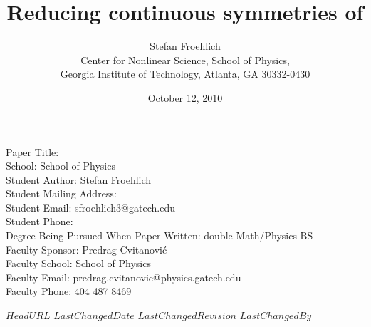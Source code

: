Paper Title:
\\School: School of Physics
\\Student Author: Stefan Froehlich
\\Student Mailing Address:
\\Student Email: sfroehlich3@gatech.edu
\\Student Phone:
\\Degree Being Pursued When Paper Written: double Math/Physics BS
\\Faculty Sponsor: Predrag Cvitanovi\'{c}
\\Faculty School: School of Physics
\\Faculty Email: predrag.cvitanovic@physics.gatech.edu
\\Faculty Phone: 404 487 8469
\newpage

    \ifarticle
    \else
    \fi %

        \title{Reducing continuous symmetries of \cLe}
        \author{
Stefan Froehlich
\\
Center for Nonlinear Science, School of Physics,
\\
Georgia Institute of Technology,
Atlanta, GA 30332-0430
        }
        \date{October 12, 2010} \Private{\date{\today}}

\hypersetup{
   pdfauthor=Stefan Froehlich,
   pdfkeywords=complex Lorenz flow,
   pdftitle=Reducing continuous symmetries}

\svnidlong          %
{$HeadURL$}
{$LastChangedDate$}
{$LastChangedRevision$}
{$LastChangedBy$}

\pagestyle{fancy}
\fancyhead{}
\fancyhead[er,ol]{\slshape \leftmark }
    \Private{ %
\fancyfoot[er,ol]{rev. \svnrev\ (\svnfileauthor, rev. \svnfilerev )}
\fancyfoot[el,or]{\svnfilemonth/\svnfileday/\svnfileyear}
    } %

